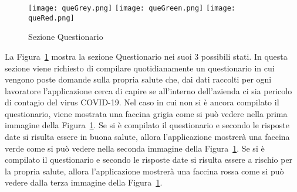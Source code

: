 \begin{trivlist}
	\begin{figure}[h]
		\centering
		\texttt{[image: queGrey.png]}\hfill
		\texttt{[image: queGreen.png]}\hfill
		\texttt{[image: queRed.png]}
		\caption{Sezione Questionario}\label{fig:que}
	\end{figure}
	
	La Figura~\ref{fig:que} mostra la sezione Questionario nei suoi 3 possibili stati. In questa sezione viene richiesto di compilare quotidianamente un questionario in cui vengono poste domande sulla propria salute che, dai dati raccolti per ogni lavoratore l'applicazione cerca di capire se all'interno dell'azienda ci sia pericolo di contagio del virus COVID-19. Nel caso in cui non si è ancora compilato il questionario, viene mostrata una faccina grigia come si può vedere nella prima immagine della Figura~\ref{fig:que}. Se si è compilato il questionario e secondo le risposte date si risulta essere in buona salute, allora l'applicazione mostrerà una faccina verde come si può vedere nella seconda immagine della Figura~\ref{fig:que}. Se si è compilato il questionario e secondo le risposte date si risulta essere a rischio per la propria salute, allora l'applicazione mostrerà una faccina rossa come si può vedere dalla terza immagine della Figura~\ref{fig:que}.
	

\end{trivlist}
